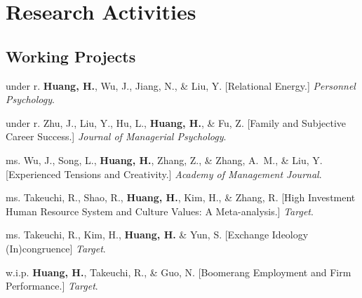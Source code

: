 \documentclass[11pt,letterpaper]{report} %
\begin{document}
    \section*{Research Activities}
    \subsection*{Working Projects}

    \begin{tablist}

        \item[under r.] \tab{}\textbf{Huang, H.}, Wu, J., Jiang, N., \& Liu, Y. [Relational Energy.] \textit{Personnel Psychology}.
        
        \item[under r.] \tab{}Zhu, J., Liu, Y., Hu, L., \textbf{Huang, H.}, \& Fu, Z. [Family and Subjective Career Success.] \textit{Journal of Managerial Psychology}.

        \item[ms.] \tab{}Wu, J., Song, L., \textbf{Huang, H.},  Zhang, Z., \& Zhang, A.~M., \& Liu, Y. [Experienced Tensions and Creativity.]  \textit{Academy of Management Journal}.

        \item[ms.] \tab{}Takeuchi, R., Shao, R., \textbf{Huang, H.}, Kim, H., \& Zhang, R. [High Investment Human Resource System and Culture Values: A Meta-analysis.] \textit{Target}.
        
        \item[ms.] \tab{}Takeuchi, R., Kim, H., \textbf{Huang, H.} \& Yun, S. [Exchange Ideology (In)congruence] \textit{Target}.

        \item[w.i.p.] \tab{}\textbf{Huang, H.}, Takeuchi, R., \& Guo, N. [Boomerang Employment and Firm Performance.] \textit{Target}.
        
    \end{tablist}





\end{document}
